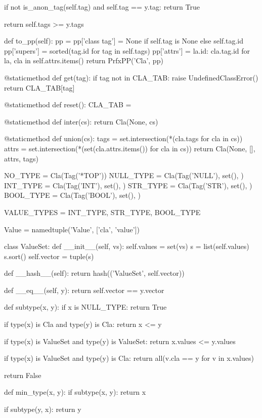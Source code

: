 \begin{dispPy}
        if not is_anon_tag(self.tag) and self.tag == y.tag:
            return True

        return self.tags >= y.tags

    def to_pp(self):
        pp = {}
        pp['class tag'] = None if self.tag is None else self.tag.id
        pp['supers'] = sorted(tag.id for tag in self.tags)
        pp['attrs'] = {la.id: cla.tag.id for la, cla in self.attrs.items()}
        return PrfxPP('Cla', pp)

    @staticmethod
    def get(tag):
        if tag not in CLA_TAB:
            raise UndefinedClassError()
        return CLA_TAB[tag]

    @staticmethod
    def reset():
        CLA_TAB = {}

    @staticmethod
    def inter(cs):
        return Cla(None, cs)

    @staticmethod
    def union(cs):
        tags = set.intersection(*(cla.tags for cla in cs))
        attrs = set.intersection(*(set(cla.attrs.items()) for cla in cs))
        return Cla(None, [], attrs, tags)

NO_TYPE = Cla(Tag('*TOP'))
NULL_TYPE = Cla(Tag('NULL'), set(), {})
INT_TYPE = Cla(Tag('INT'), set(), {})
STR_TYPE = Cla(Tag('STR'), set(), {})
BOOL_TYPE = Cla(Tag('BOOL'), set(), {})

VALUE_TYPES = {INT_TYPE, STR_TYPE, BOOL_TYPE}

Value = namedtuple('Value', ['cla', 'value'])

class ValueSet:
    def __init__(self, vs):
        self.values = set(vs)
        s = list(self.values)
        s.sort()
        self.vector = tuple(s)

    def __hash__(self):
        return hash(('ValueSet', self.vector))

    def __eq__(self, y):
        return self.vector == y.vector

def subtype(x, y):
    if x is NULL_TYPE:
        return True

    if type(x) is Cla and type(y) is Cla:
        return x <= y

    if type(x) is ValueSet and type(y) is ValueSet:
        return x.values <= y.values

    if type(x) is ValueSet and type(y) is Cla:
        return all(v.cla == y for v in x.values)

    return False

def min_type(x, y):
    if subtype(x, y):
        return x

    if subtype(y, x):
        return y


\end{dispPy}
